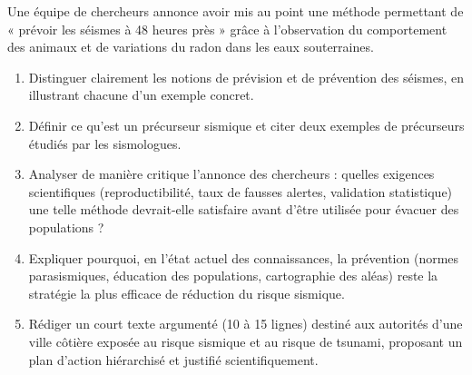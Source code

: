 \documentclass[11pt]{article}
\begin{document}
\begin{exercice}
Une équipe de chercheurs annonce avoir mis au point une méthode permettant de « prévoir les séismes à 48 heures près » grâce à l'observation du comportement des animaux et de variations du radon dans les eaux souterraines.

\begin{enumerate}
\item Distinguer clairement les notions de prévision et de prévention des séismes, en illustrant chacune d'un exemple concret.
\item Définir ce qu'est un précurseur sismique et citer deux exemples de précurseurs étudiés par les sismologues.
\item Analyser de manière critique l'annonce des chercheurs : quelles exigences scientifiques (reproductibilité, taux de fausses alertes, validation statistique) une telle méthode devrait-elle satisfaire avant d'être utilisée pour évacuer des populations ?
\item Expliquer pourquoi, en l'état actuel des connaissances, la prévention (normes parasismiques, éducation des populations, cartographie des aléas) reste la stratégie la plus efficace de réduction du risque sismique.
\item Rédiger un court texte argumenté (10 à 15 lignes) destiné aux autorités d'une ville côtière exposée au risque sismique et au risque de tsunami, proposant un plan d'action hiérarchisé et justifié scientifiquement.
\end{enumerate}
\end{exercice}
\end{document}
